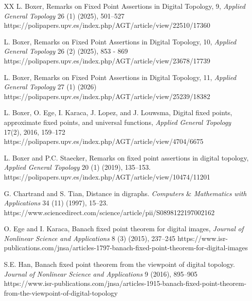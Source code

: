 \documentclass{article}
\numberwithin{thm}{section}
\begin{document}
\begin{thebibliography}{XX}
L. Boxer, Remarks on Fixed Point Assertions in Digital Topology, 9, 
{\em Applied General Topology} 26 (1) (2025), 501--527
\newline
https://polipapers.upv.es/index.php/AGT/article/view/22510/17360

L. Boxer,
Remarks on Fixed Point Assertions in Digital Topology, 10, 
{\em Applied General Topology} 26 (2) (2025), 853 - 869
\newline
https://polipapers.upv.es/index.php/AGT/article/view/23678/17739

L. Boxer, 
Remarks on Fixed Point Assertions in Digital Topology, 11,
{\em Applied General Topology}
27 (1) (2026)
\newline
https://polipapers.upv.es/index.php/AGT/article/view/25239/18382

 L. Boxer, O. Ege, I. Karaca, J. Lopez, and J. Louwsma,
 Digital fixed points, approximate fixed points, 
 and universal functions, 
 {\em Applied General Topology} 
 17(2), 2016, 159--172
 \newline
 https://polipapers.upv.es/index.php/AGT/article/view/4704/6675

L. Boxer and P.C. Staecker,
Remarks on fixed point assertions in digital topology,
{\em Applied General Topology} 20 (1) (2019), 135--153.
\newline
https://polipapers.upv.es/index.php/AGT/article/view/10474/11201

G. Chartrand and S. Tian, 
Distance in digraphs. 
{\em Computers $\&$ Mathematics with Applications}
34 (11) (1997), 15--23.
\newline
https://www.sciencedirect.com/science/article/pii/S0898122197002162


O. Ege and I. Karaca,
Banach fixed point theorem for digital images,
{\em Journal of Nonlinear Science
and Applications} 8 (3) (2015),
237--245 \newline
https://www.isr-publications.com/jnsa/articles-1797-banach-fixed-point-theorem-for-digital-images


S.E. Han, 
Banach fixed point theorem from the viewpoint of digital topology.
{\em Journal of Nonlinear Science and Applications} 9 (2016), 895--905 
\newline
https://www.isr-publications.com/jnsa/articles-1915-banach-fixed-point-theorem-from-the-viewpoint-of-digital-topology



\end{thebibliography}
\end{document}
